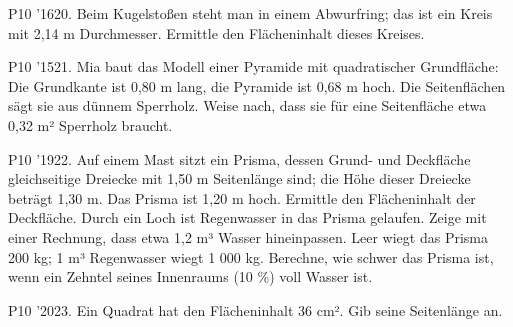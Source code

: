 \documentclass[11pt]{article}
\begin{document}
\pfgruppe{}
\begin{pfaufg}{P10 ’16}{20.}{}
Beim Kugelstoßen steht man in einem Abwurfring; das ist ein Kreis mit 2,14 m Durchmesser. Ermittle den Flächeninhalt dieses Kreises.
\end{pfaufg}
\pfgruppe{}
\begin{pfaufg}{P10 ’15}{21.}{}
Mia baut das Modell einer Pyramide mit quadratischer Grundfläche: Die Grundkante ist 0,80 m lang, die Pyramide ist 0,68 m hoch. Die Seitenflächen sägt sie aus dünnem Sperrholz. Weise nach, dass sie für eine Seitenfläche etwa 0,32 m² Sperrholz braucht.
\end{pfaufg}
\pfgruppe{}
\begin{pfaufg}{P10 ’19}{22.}{}
Auf einem Mast sitzt ein Prisma, dessen Grund- und Deckfläche gleichseitige Dreiecke mit 1,50 m Seitenlänge sind; die Höhe dieser Dreiecke beträgt 1,30 m. Das Prisma ist 1,20 m hoch. Ermittle den Flächeninhalt der Deckfläche. Durch ein Loch ist Regenwasser in das Prisma gelaufen. Zeige mit einer Rechnung, dass etwa 1,2 m³ Wasser hineinpassen. Leer wiegt das Prisma 200 kg; 1 m³ Regenwasser wiegt 1 000 kg. Berechne, wie schwer das Prisma ist, wenn ein Zehntel seines Innenraums (10 \%) voll Wasser ist.
\par\smallskip\noindent {}\par
{}
\end{pfaufg}
\pfgruppe{}
\begin{pfaufg}{P10 ’20}{23.}{}
Ein Quadrat hat den Flächeninhalt 36 cm². Gib seine Seitenlänge an.
\end{pfaufg}
\end{document}
